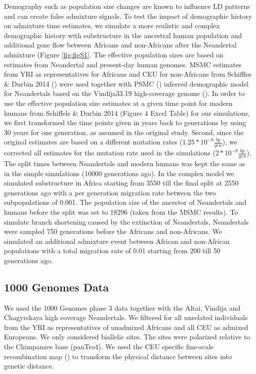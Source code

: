 \documentclass[]{article}
\begin{document}
Demography such as population size changes are known to influence LD
patterns and can create false admixture signals. To test the impact of
demographic history on admixture time estimates, we simulate a more
realistic and complex demographic history with substructure in the ancestral human population and additional gene flow between Africans and non-Africans after the Neandertal admixture (Figure \ref{fig:figS1}. The 
effective population
sizes are based on estimates from Neandertal and present-day human
genomes. MSMC estimates from YRI as representatives for Africans and CEU
for non-Africans from Schiffles \& Durbin 2014
(\cite{schiffels_inferring_2014}) were used together with PSMC
(\cite{li_inference_2011}) inferred demographic model for Neandertals
based on the Vindija33.19 high-coverage genome
(\cite{prufer_high-coverage_2017}). In order to use the effective
population size estimates at a given time point for modern humans from
Schiffels \& Durbin 2014 (Figure 4 Excel Table) for our simulations, we
first transformed the time points given in years back to generations by
using 30 years for one generation, as assumed in the original study.
Second, since the original estimates are based on a different mutation
rates (\(1.25*10^{-8} \frac{bp}{gen}\)), we corrected all estimates for
the mutation rate used in the simulations
(\(2*10^{-8} \frac{bp}{gen}\)). The split times between Neandertals and
modern humans was kept the
same as in the simple simulations (10000 generations ago). In the complex model we simulated substructure in Africa starting from 3550 till the final split at 2550 generations ago with a per generation migration rate between the two subpopulations of 0.001. The population size of the ancestor of Neandertals and
humans before the split was set to 18296 (taken from the MSMC results). To simulate branch shortening
caused by the extinction of Neandertals, Neandertals were sampled 750
generations before the Africans and non-Africans. We simulated an additional admixture event between African and non-African populations with a total migration rate of 0.01 starting from 200 till 50 generations ago.

\subsection{1000 Genomes Data}\label{1000 Genomes Data}

We used the 1000 Genomes phase 3 data together with the Altai, Vindija and Chagyrskaya high coverage Neandertals.  We filtered for all unrelated individuals from the YRI as representatives of unadmixed Africans and all CEU as admixed Europeans. We only considered biallelic sites. The sites were polarized relative to the Chimpanzee base (panTro4). We used the CEU specific fine-scale recombination map (\cite{spence_inference_2019}) to transform the physical distance between sites into genetic distance. 
\end{document}
